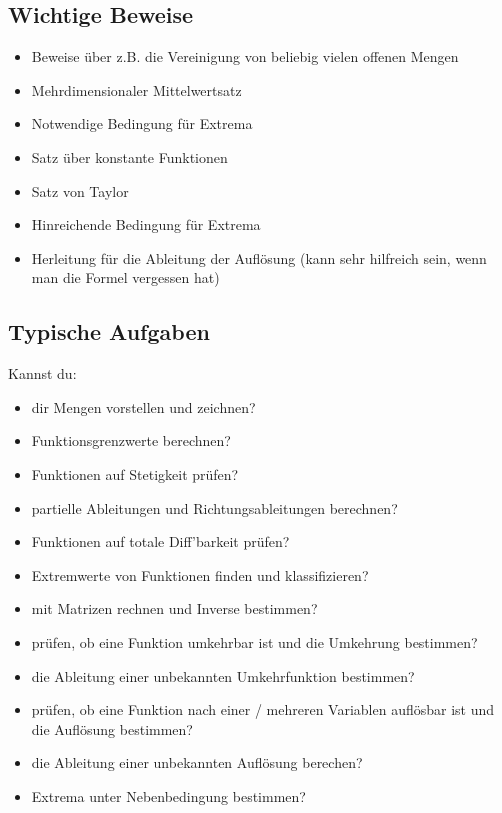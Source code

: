 \subsection{Wichtige Beweise}
\begin{itemize}
  \item Beweise über z.B. die Vereinigung von beliebig vielen offenen Mengen
  \item Mehrdimensionaler Mittelwertsatz
  \item Notwendige Bedingung für Extrema
  \item Satz über konstante Funktionen
  \item Satz von Taylor
  \item Hinreichende Bedingung für Extrema
  \item Herleitung für die Ableitung der Auflösung (kann sehr hilfreich sein,
        wenn man die Formel vergessen hat)
\end{itemize}

\subsection{Typische Aufgaben}
Kannst du:
\begin{itemize}
  \item dir Mengen vorstellen und zeichnen?
  \item Funktionsgrenzwerte berechnen?
  \item Funktionen auf Stetigkeit prüfen?
  \item partielle Ableitungen und Richtungsableitungen berechnen?
  \item Funktionen auf totale Diff'barkeit prüfen?
  \item Extremwerte von Funktionen finden und klassifizieren?
  \item mit Matrizen rechnen und Inverse bestimmen?
  \item prüfen, ob eine Funktion umkehrbar ist und die Umkehrung bestimmen?
  \item die Ableitung einer unbekannten Umkehrfunktion bestimmen?
  \item prüfen, ob eine Funktion nach einer / mehreren Variablen auflösbar ist und die Auflösung bestimmen?
  \item die Ableitung einer unbekannten Auflösung berechen?
  \item Extrema unter Nebenbedingung bestimmen?
\end{itemize}
